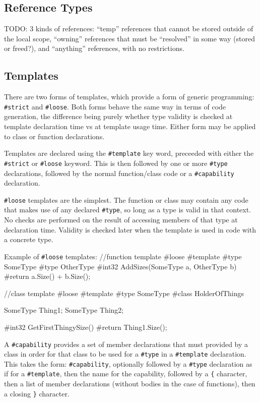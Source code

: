 \documentclass{article}
\newcommand{\code}[1]{\colorbox{light-gray}{\texttt{#1}}}
\newenvironment{codebox} {\snugshade\verbatim} {\endverbatim\endsnugshade}
\begin{document}
\subsection{Reference Types}

TODO: 3 kinds of references: ``temp'' references that cannot be stored outside of the local scope, ``owning'' references that must be ``resolved'' in some way (stored or freed?), and ``anything'' references, with no restrictions.

\subsection{Templates}

There are two forms of templates, which provide a form of generic programming: \code{\#strict} and \code{\#loose}.  Both forms behave the same way in terms of code generation, the difference being purely whether type validity is checked at template declaration time vs at template usage time.  Either form may be applied to class or function declarations.

Templates are declared using the \code{\#template} key word, preceeded with either the \code{\#strict} or \code{\#loose} keyword.  This is then followed by one or more \code{\#type} declarations, followed by the normal function/class code or a \code{\#capability} declaration.

\code{\#loose} templates are the simplest.  The function or class may contain any code that makes use of any declared \code{\#type}, so long as a type is valid in that context.  No checks are performed on the result of accessing members of that type at declaration time.  Validity is checked later when the template is used in code with a concrete type.

Example of \code{\#loose} templates:
\begin{codebox}
//function template
#loose #template
#type SomeType
#type OtherType
#int32 AddSizes(SomeType a, OtherType b)
{
    #return a.Size() + b.Size();
}

//class template
#loose #template
#type SomeType
#class HolderOfThings
{
    SomeType Thing1;
    SomeType Thing2;
    
    #int32 GetFirstThingySize()
    {
        #return Thing1.Size();
    }
}
\end{codebox}

A \code{\#capability} provides a set of member declarations that must provided by a class in order for that class to be used for a \code{\#type} in a \code{\#template} declaration.  This takes the form: \code{\#capability}, optionally followed by a \code{\#type} declaration as if for a \code{\#template}, then the name for the capability, followed by a \code{\{} character, then a list of member declarations (without bodies in the case of functions), then a closing \code{\}} character.
\end{document}
